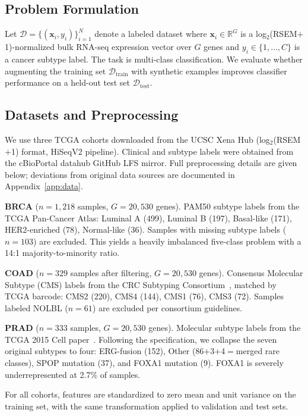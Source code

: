 \documentclass{article}
\begin{document}
\subsection{Problem Formulation}

Let $\mathcal{D} = \{(\mathbf{x}_i, y_i)\}_{i=1}^{N}$ denote a labeled dataset where
$\mathbf{x}_i \in \mathbb{R}^G$ is a log$_2$(RSEM$+$1)-normalized bulk RNA-seq expression
vector over $G$ genes and $y_i \in \{1, \ldots, C\}$ is a cancer subtype label. The task is
multi-class classification. We evaluate whether augmenting the training set
$\mathcal{D}_\text{train}$ with synthetic examples improves classifier performance on a held-out
test set $\mathcal{D}_\text{test}$.

\subsection{Datasets and Preprocessing}

We use three TCGA cohorts downloaded from the UCSC Xena Hub (log$_2$(RSEM$+$1) format, HiSeqV2
pipeline). Clinical and subtype labels were obtained from the cBioPortal datahub GitHub LFS
mirror. Full preprocessing details are given below; deviations from original data sources are
documented in Appendix~\ref{app:data}.

\textbf{BRCA} ($n{=}1{,}218$ samples, $G{=}20{,}530$ genes). PAM50 subtype labels from the
TCGA Pan-Cancer Atlas: Luminal A (499), Luminal B (197), Basal-like (171), HER2-enriched (78),
Normal-like (36). Samples with missing subtype labels ($n{=}103$) are excluded. This yields a
heavily imbalanced five-class problem with a 14:1 majority-to-minority ratio.

\textbf{COAD} ($n{=}329$ samples after filtering, $G{=}20{,}530$ genes). Consensus Molecular
Subtype (CMS) labels from the CRC Subtyping Consortium~\cite{Guinney2015}, matched by TCGA
barcode: CMS2 (220), CMS4 (144), CMS1 (76), CMS3 (72). Samples labeled NOLBL ($n{=}61$) are
excluded per consortium guidelines.

\textbf{PRAD} ($n{=}333$ samples, $G{=}20{,}530$ genes). Molecular subtype labels from the
TCGA 2015 Cell paper~\cite{Cancer2015}. Following the specification, we collapse the seven
original subtypes to four: ERG-fusion (152), Other (86$+$3$+$4$=$merged rare classes), SPOP
mutation (37), and FOXA1 mutation (9). FOXA1 is severely underrepresented at 2.7\% of samples.

For all cohorts, features are standardized to zero mean and unit variance on the training set,
with the same transformation applied to validation and test sets.
\end{document}
